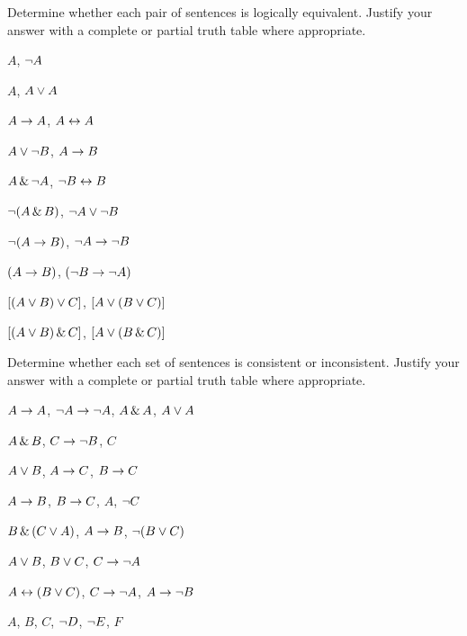 \solutions
\problempart
\label{pr.TT.equiv}
Determine whether each pair of sentences is logically equivalent. Justify your answer with a complete or partial truth table where appropriate.
\begin{earg}
\item $A$, $\neg A$ %
\item $A$, $A \vee A$ %
\item $A\rightarrow A$, $A \leftrightarrow A$ %
\item $A \vee \neg B$, $A\rightarrow B$ %
\item $A \,\&\, \neg A$, $\neg B \leftrightarrow B$ %
\item $\neg(A \,\&\, B)$, $\neg A \vee \neg B$ %
\item $\neg(A \rightarrow B)$, $\neg A \rightarrow \neg B$ %
\item $(A \rightarrow B)$, $(\neg B \rightarrow \neg A)$ %
\item $[(A \vee B) \vee C]$, $[A \vee (B \vee C)]$ %
\item $[(A \vee B) \,\&\, C]$, $[A \vee (B \,\&\, C)]$ %
\end{earg}

\solutions
\problempart
\label{pr.TT.consistent}
Determine whether each set of sentences is consistent or inconsistent. Justify your answer with a complete or partial truth table where appropriate.
\begin{earg}
\item $A\rightarrow A$, $\neg A \rightarrow \neg A$, $A\,\&\, A$, $A\vee A$ %
\item $A \,\&\, B$, $C\rightarrow \neg B$, $C$ %
\item $A\vee B$, $A\rightarrow C$, $B\rightarrow C$ %
\item $A\rightarrow B$, $B\rightarrow C$, $A$, $\neg C$ %
\item $B\,\&\,(C\vee A)$, $A\rightarrow B$, $\neg(B\vee C)$  %
\item $A \vee B$, $B\vee C$, $C\rightarrow \neg A$ %
\item $A\leftrightarrow(B\vee C)$, $C\rightarrow \neg A$, $A\rightarrow \neg B$ %
\item $A$, $B$, $C$, $\neg D$, $\neg E$, $F$ %
\end{earg}

